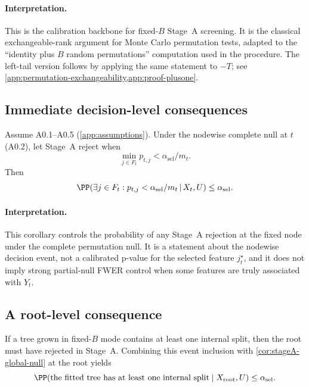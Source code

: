 \paragraph{Interpretation.}
This is the calibration backbone for fixed-$B$ Stage~A screening. It is the
classical exchangeable-rank argument for Monte Carlo permutation tests,
adapted to the ``identity plus $B$ random permutations'' computation used in
the procedure. The left-tail version follows by applying the same statement to
$-T$; see \cref{app:permutation-exchangeability,app:proof-plusone}.

\subsection{Immediate decision-level consequences}
\label{sec:theory-stageA}

\begin{corollary}
\label{cor:stageA-global-null}
Assume A0.1--A0.5 (\cref{app:assumptions}). Under the nodewise complete null at
$t$ (A0.2), let Stage~A reject when
%
\begin{equation}
  \min_{j \in F_t} p_{t,j} < \alpha_{\mathrm{sel}}/m_t.
\end{equation}
%
Then
%
\begin{equation}
  \PP\!\left(\exists j \in F_t : p_{t,j} < \alpha_{\mathrm{sel}}/m_t \,\middle|\, X_t,U\right)
  \le \alpha_{\mathrm{sel}}.
\end{equation}
\end{corollary}

\paragraph{Interpretation.}
This corollary controls the probability of any Stage~A rejection at the fixed
node under the complete permutation null. It is a statement about the nodewise
decision event, not a calibrated p-value for the selected feature
$j_t^\star$, and it does not imply strong partial-null FWER control when some
features are truly associated with $Y_t$.

\subsection{A root-level consequence}
\label{sec:theory-root}

\begin{remark}
If a tree grown in fixed-$B$ mode contains at least one internal split, then
the root must have rejected in Stage~A. Combining this event inclusion with
\cref{cor:stageA-global-null} at the root yields
%
\begin{equation}
  \PP(\text{the fitted tree has at least one internal split} \mid X_{\mathrm{root}},U)
  \le \alpha_{\mathrm{sel}}.
\end{equation}
\end{remark}

